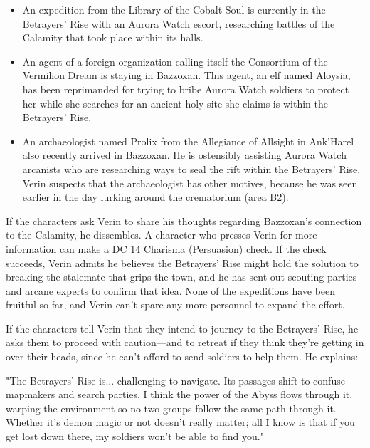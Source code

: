 \documentclass[10pt,a4paper,twoside,twocolumn,openany,nodeprecatedcode]{dndbook}
\begin{document}
\begin{itemize}
\item An expedition from the Library of the Cobalt Soul is currently in the Betrayers' Rise with an Aurora Watch escort, researching battles of the Calamity that took place within its halls.
\item An agent of a foreign organization calling itself the Consortium of the Vermilion Dream is staying in Bazzoxan. This agent, an elf named Aloysia, has been reprimanded for trying to bribe Aurora Watch soldiers to protect her while she searches for an ancient holy site she claims is within the Betrayers' Rise.
\item An archaeologist named Prolix from the Allegiance of Allsight in Ank'Harel also recently arrived in Bazzoxan. He is ostensibly assisting Aurora Watch arcanists who are researching ways to seal the rift within the Betrayers' Rise. Verin suspects that the archaeologist has other motives, because he was seen earlier in the day lurking around the crematorium (area B2).
\end{itemize}

If the characters ask Verin to share his thoughts regarding Bazzoxan's connection to the Calamity, he dissembles. A character who presses Verin for more information can make a DC 14 Charisma (Persuasion) check. If the check succeeds, Verin admits he believes the Betrayers' Rise might hold the solution to breaking the stalemate that grips the town, and he has sent out scouting parties and arcane experts to confirm that idea. None of the expeditions have been fruitful so far, and Verin can't spare any more personnel to expand the effort.

If the characters tell Verin that they intend to journey to the Betrayers' Rise, he asks them to proceed with caution—and to retreat if they think they're getting in over their heads, since he can't afford to send soldiers to help them. He explains:

\begin{DndReadAloud}{}
"The Betrayers' Rise is... challenging to navigate. Its passages shift to confuse mapmakers and search parties. I think the power of the Abyss flows through it, warping the environment so no two groups follow the same path through it. Whether it's demon magic or not doesn't really matter; all I know is that if you get lost down there, my soldiers won't be able to find you."

\end{DndReadAloud}
\end{document}
